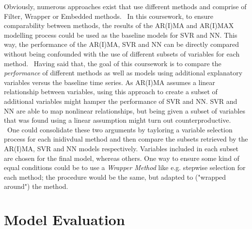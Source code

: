 \documentclass[a4paper, 11pt]{article}
\begin{document}
Obviously, numerous approaches exist that use different methods and comprise of Filter, Wrapper or Embedded methods. \
In this coursework, to ensure comparability between methods, the results of the AR(I)MA and AR(I)MAX modelling process could  be used as the baseline models for SVR and NN. This way, the performance of the AR(I)MA, SVR and NN can be directly compared without being confounded with the use of different subsets of variables for each method. \
Having said that, the goal of this coursework is to compare the \textit{performance} of different methods as well as models using additional explanatory variables versus the baseline time series. As AR(I)MA assumes a linear relationship between variables, using this approach to create a subset of additional variables might hamper the performance of SVR and NN. SVR and NN are able to map nonlinear relationships, but being given a subset of variables that was found using a linear assumption might turn out counterproductive. \
One could consolidate these two arguments by tayloring a variable selection process for each inidivdual method and then compare the subsets retrieved by the AR(I)MA, SVR and NN models respectively. Variables included in each subset are chosen for the final model, whereas others. One way to ensure some kind of equal conditions could be to use a \textit{Wrapper Method} like e.g. stepwise selection for each method; the procedure would be the same, but adapted to ("wrapped around") the method.


\section{Model Evaluation}
\end{document}
